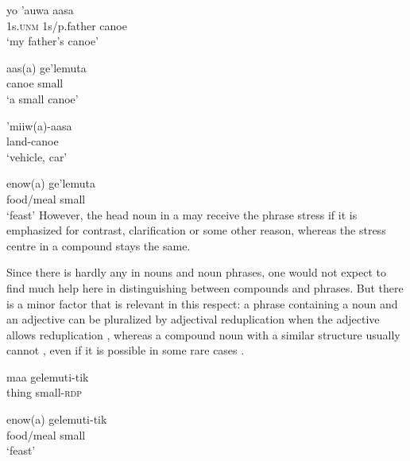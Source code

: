 \ea%
\label{ex:3:x29}
\gll yo 'auwa aasa\footnotemark{} \\
1s.\textsc{unm} 1s/p.father canoe\\
\glt`my father's canoe'
\z


\ea%
\label{ex:3:x30}
\gll aas(a) ge'lemuta \\
canoe small\\
\glt`a small canoe'
\z

\ea%
\label{ex:3:x31}
\gll 'miiw(a)-aasa\footnotemark{} \\
land-canoe\\
\glt`vehicle, car'
\z
{}

\ea%
\label{ex:3:x32}
\gll enow(a) ge'lemuta{\footnotemark} \\
food/meal small\\
\glt`feast'
\z
{}
However, the head noun in a  may receive the phrase stress if it is emphasized for contrast, clarification or some other reason, whereas the stress centre in a compound stays the same. 

Since there is hardly any  in nouns and noun phrases, one would not expect to find much help here in distinguishing between compounds and phrases. But there is a minor factor that is relevant in this respect: a phrase containing a noun and an adjective can be pluralized by adjectival reduplication when the adjective allows reduplication , whereas a compound noun with a similar structure usually cannot , even if it is possible in some rare cases . 

\ea%
\label{ex:3:x33}
\gll maa gelemuti-tik \\
thing small-\textsc{rdp}\\
\z

\ea%
\label{ex:3:x34}
\gll *enow(a) gelemuti-tik \\
food/meal small\\
\glt `feast'
\z


